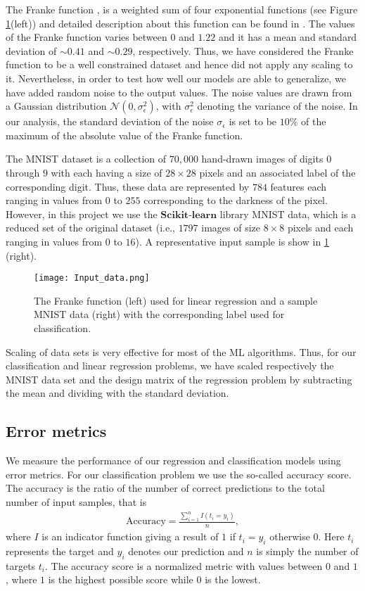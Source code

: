 \documentclass[a4paper]{article}
\begin{document}
The Franke function \cite{franke1979critical}, is a weighted sum of four exponential functions (see Figure \ref{Input_data}(left)) and detailed description about this function can be found in \cite{Jing2020}. The values of the Franke function varies between $0$ and $1.22$ and it has a mean and standard deviation of $\sim0.41$ and $\sim0.29$, respectively. Thus, we have considered the Franke function to be a well constrained dataset and hence did not apply any scaling to it. Nevertheless, in order to test how well our models are able to generalize, we have added random noise to the output values. The noise values are drawn from a Gaussian distribution $\mathcal{N}(0,\sigma_{\epsilon}^2)$, with $\sigma_{\epsilon}^2$ denoting the variance of the noise. In our analysis, the standard deviation of the noise $\sigma_{\epsilon}$ is set to be $10\%$ of the maximum of the absolute value of the Franke function.

The MNIST dataset is a collection of $70,000$ hand-drawn images of digits $0$ through $9$ with each having a size of $28\times28$ pixels and an associated label of the corresponding digit. Thus, these data are represented by $784$ features each ranging in values from $0$ to $255$ corresponding to the darkness of the pixel. However, in this project we use the $\mathbf{Scikit}$-$\mathbf{learn}$ library MNIST data, which is a reduced set of the original dataset (i.e., $1797$ images of size $8\times8$ pixels and each ranging in values from $0$ to $16$). A representative input sample is show in \ref{Input_data} (right).

\begin{figure}[H]
  \centering
  \texttt{[image: Input\_data.png]}
  \caption{The Franke function (left) used for linear regression and a sample MNIST data (right) with the corresponding label used for classification.}
  \label{Input_data}
\end{figure}

Scaling of data sets is very effective for most of the ML algorithms. Thus, for our classification and linear regression problems, we have scaled respectively the MNIST data set and the design matrix of the regression problem by subtracting the mean and dividing with the standard deviation. 

\subsection{Error metrics}
We measure the performance of our regression and classification models using error metrics. For our classification problem we use the so-called accuracy score. The accuracy is the ratio of the number of correct predictions to the total number of input samples, that is
\begin{align}
    \text{Accuracy} = \frac{\sum_{i=1}^n I(t_i = y_i)}{n},
\end{align}
where $I$ is an indicator function giving a result of $1$ if $t_i = y_i$ otherwise $0$. Here $t_i$ represents the target and $y_i$ denotes our prediction and $n$ is simply the number of targets $t_i$. The accuracy score is a normalized metric with values between $0$ and $1$, where $1$ is the highest possible score while $0$ is the lowest. 
\end{document}
